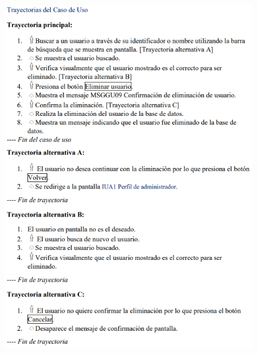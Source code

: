 \documentclass[12pt,letterpaper]{article}
\begin{document}
            \begin{figure}[H]
                \centering
                \includegraphics [scale=0.9]{specs/trayEliminarUsuario}
            \end{figure}
\end{document}
